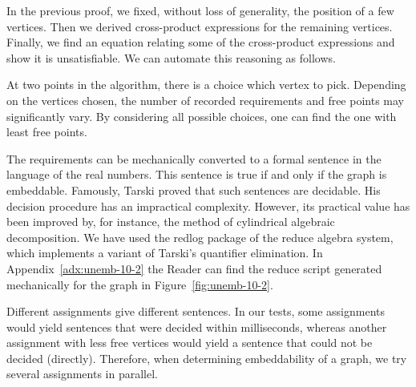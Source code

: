 \documentclass[a4paper]{article}
\newcounter{main}
\theoremstyle{definition}
\theoremstyle{remark}
\begin{document}

In the previous proof, we fixed, without loss of generality, the position
of a few vertices.  Then we derived cross-product expressions for the
remaining vertices.  Finally, we find an equation relating some of
the cross-product expressions and show it is unsatisfiable.
We can automate this reasoning as follows.

\begin{algorithm}
\end{algorithm}
At two points in the algorithm, there is a choice which vertex to pick.
Depending on the vertices chosen, the number of recorded requirements
and free points may significantly vary. By considering all possible choices,
one can find the one with least free points.

The requirements can be mechanically converted
to a formal sentence
in the language of the real numbers.
This sentence is true if and only if the graph is embeddable.
Famously, Tarski proved\cite{tarski}
that such sentences are decidable.
His decision procedure has an impractical complexity.
However, its practical value has been improved
by, for instance, the method of cylindrical algebraic decomposition\cite{qecad}.
We have used the redlog\cite{redlog} package of the reduce algebra
system, which implements a variant of Tarski's quantifier elimination.
In Appendix~\ref{adx:unemb-10-2} the Reader can find
the reduce script generated mechanically for the graph
in Figure~\ref{fig:unemb-10-2}.

Different assignments give different sentences.  In our tests,
some assignments would yield sentences that were decided within milliseconds,
whereas another assignment with less free vertices would
yield a sentence that could not be decided (directly).
Therefore, when determining embeddability of a graph,
we try several assignments in parallel.
\end{document}
